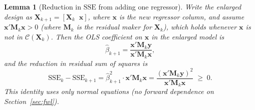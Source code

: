\documentclass[14pt]{extarticle}
\theoremstyle{plain}
\newtheorem{lemma}[theorem]{Lemma}
\theoremstyle{definition}
\theoremstyle{remark}
\newcommand{\SSE}{\mathrm{SSE}}
\newcommand{\bX}{\mathbf{X}}
\newcommand{\by}{\mathbf{y}}
\newcommand{\bx}{\mathbf{x}}
\newcommand{\bM}{\mathbf{M}}
\newcommand{\calC}{\mathcal{C}}
\begin{document}
\begin{lemma}[Reduction in $\SSE$ from adding one regressor]\label{lem:sse-reduction}
Write the enlarged design as $\bX_{k+1} = [\bX_k \;\; \bx]$, where $\bx$ is the new regressor column, and assume $\bx'\bM_k\bx > 0$ (where $\bM_k$ is the residual maker for $\bX_k$), which holds whenever $\bx$ is not in $\calC(\bX_k)$. Then the OLS coefficient on $\bx$ in the enlarged model is
\begin{equation}\label{eq:beta-new}
\hat{\beta}_{k+1} = \frac{\bx'\bM_k\by}{\bx'\bM_k\bx},
\end{equation}
and the reduction in residual sum of squares is
\begin{equation}\label{eq:sse-reduction}
\SSE_k - \SSE_{k+1} = \hat{\beta}_{k+1}^2 \cdot \bx'\bM_k\bx = \frac{(\bx'\bM_k\by)^2}{\bx'\bM_k\bx} \;\geqslant\; 0.
\end{equation}
This identity uses only normal equations (no forward dependence on Section~\ref{sec:fwl}).
\end{lemma}
\end{document}
